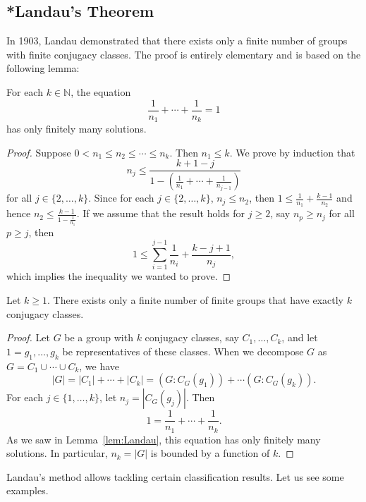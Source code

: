 \subsection{*Landau's Theorem}

In 1903, Landau demonstrated that there exists only a finite number of groups with finite conjugacy classes. The proof is entirely elementary and is based on the following lemma:

\begin{lemma}[Landau]
  \label{lem:Landau}
  For each $k \in \mathbb{N}$, the equation 
  \[
	\frac{1}{n_1}+\cdots+\frac{1}{n_k}=1
  \]
  has only finitely many solutions.
\end{lemma}

\begin{proof}
  Suppose $0 < n_1 \leq n_2 \leq \cdots \leq n_k$. Then $n_1 \leq k$.
  We prove by induction that 
  \[
    n_j \leq \frac{k+1-j}{1-\left(\frac{1}{n_1}+\cdots+\frac{1}{n_{j-1}}\right)}
  \]
  for all $j \in \{2,\dots,k\}$. Since for each $j \in \{2,\dots,k\}$, $n_j \leq n_2$, then $1 \leq \frac{1}{n_1}+\frac{k-1}{n_2}$ and hence $n_2 \leq \frac{k-1}{1-\frac{1}{n_1}}$. If we assume that the result holds for $j \geq 2$, say $n_p \geq n_j$ for all $p \geq j$, then
  \[
	1 \leq \sum_{i=1}^{j-1}\frac{1}{n_i}+\frac{k-j+1}{n_j},
  \]
  which implies the inequality we wanted to prove.
\end{proof}

\begin{theorem}[Landau]
  Let $k\geq1$. There exists only a finite number of finite groups that have exactly $k$ conjugacy classes.
\end{theorem}

\begin{proof}
  Let $G$ be a group with $k$ conjugacy classes, say $C_1,\dots,C_k$, and let $1=g_1,\dots,g_k$ be representatives of these classes. When we decompose $G$ as $G=C_1\cup\cdots\cup C_k$, we have 
  \[
    |G|=|C_1|+\cdots+|C_k|=(G:C_G(g_1))+\cdots(G:C_G(g_k)).
  \]
  For each $j \in \{1,\dots,k\}$, let $n_j=|C_G(g_j)|$. Then 
  \[
	1=\frac{1}{n_1}+\cdots+\frac{1}{n_k}.
  \]
  As we saw in Lemma~\ref{lem:Landau}, this equation has only finitely many solutions. In particular, $n_k=|G|$ is bounded by a function of $k$.
\end{proof}

Landau's method allows tackling certain classification results. Let us 
see some examples.

